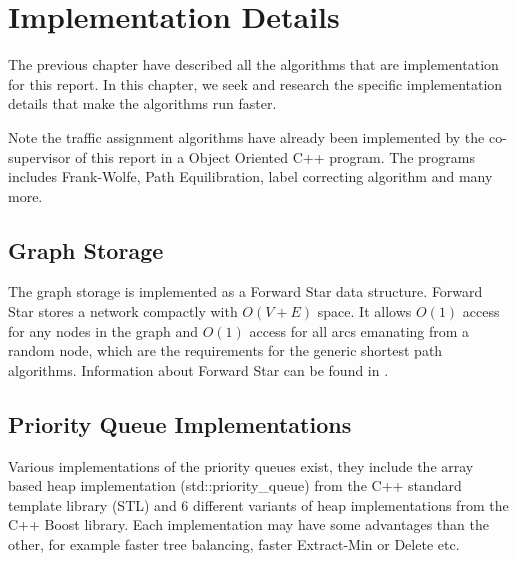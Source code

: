 \chapter{Implementation Details} \label{chap:implementation}

The previous chapter have described all the algorithms that are implementation for this report. 
In this chapter, we seek and research the specific implementation details that make the algorithms run faster.

Note the traffic assignment algorithms have already been implemented by the co-supervisor of this report in a Object Oriented C++ program.
The programs includes Frank-Wolfe, Path Equilibration,
label correcting algorithm and many more.

\section{Graph Storage}
The graph storage is implemented as a Forward Star data structure.
Forward Star stores a network compactly with $O(V+E)$ space.
It allows $O(1)$ access for any nodes in the graph and $O(1)$ access
for all arcs emanating from a random node,
which are the requirements for the generic shortest path algorithms.
Information about Forward Star can be found in \citep{Sheffi}.

\section{Priority Queue Implementations}

Various implementations of the priority queues exist,
they include the array based heap implementation (std::priority\_queue) from the C++ standard template library (STL) and 6 different variants of heap implementations from the C++ Boost library.
Each implementation may have some advantages than the other,
for example faster tree balancing, faster Extract-Min or Delete etc.

